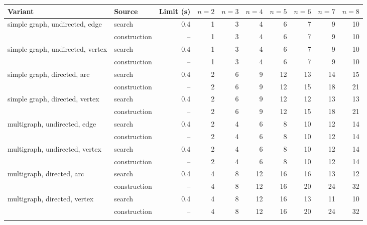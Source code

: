 \begin{tabular}{llrrrrrrrr}
\toprule
Variant & Source & Limit (s) & $n=2$ & $n=3$ & $n=4$ & $n=5$ & $n=6$ & $n=7$ & $n=8$ \\
\midrule
simple graph, undirected, edge & search & 0.4 & 1 & 3 & 4 & 6 & 7 & 9 & 10 \\
 & construction & -- & 1 & 3 & 4 & 6 & 7 & 9 & 10 \\
\addlinespace[2pt]
simple graph, undirected, vertex & search & 0.4 & 1 & 3 & 4 & 6 & 7 & 9 & 10 \\
 & construction & -- & 1 & 3 & 4 & 6 & 7 & 9 & 10 \\
\addlinespace[2pt]
simple graph, directed, arc & search & 0.4 & 2 & 6 & 9 & 12 & 13 & 14 & 15 \\
 & construction & -- & 2 & 6 & 9 & 12 & 15 & 18 & 21 \\
\addlinespace[2pt]
simple graph, directed, vertex & search & 0.4 & 2 & 6 & 9 & 12 & 12 & 13 & 13 \\
 & construction & -- & 2 & 6 & 9 & 12 & 15 & 18 & 21 \\
\addlinespace[2pt]
multigraph, undirected, edge & search & 0.4 & 2 & 4 & 6 & 8 & 10 & 12 & 14 \\
 & construction & -- & 2 & 4 & 6 & 8 & 10 & 12 & 14 \\
\addlinespace[2pt]
multigraph, undirected, vertex & search & 0.4 & 2 & 4 & 6 & 8 & 10 & 12 & 14 \\
 & construction & -- & 2 & 4 & 6 & 8 & 10 & 12 & 14 \\
\addlinespace[2pt]
multigraph, directed, arc & search & 0.4 & 4 & 8 & 12 & 16 & 16 & 13 & 12 \\
 & construction & -- & 4 & 8 & 12 & 16 & 20 & 24 & 32 \\
\addlinespace[2pt]
multigraph, directed, vertex & search & 0.4 & 4 & 8 & 12 & 16 & 13 & 11 & 10 \\
 & construction & -- & 4 & 8 & 12 & 16 & 20 & 24 & 32 \\
\addlinespace[2pt]
\bottomrule
\end{tabular}
